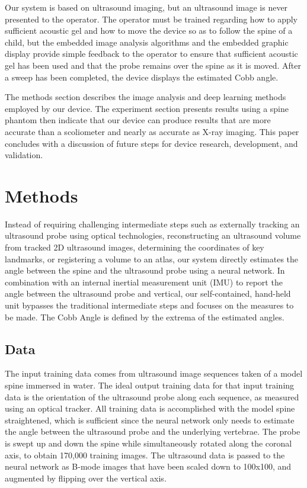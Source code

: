 \documentclass{article}
\begin{document}
Our system is based on ultrasound imaging, but an ultrasound image is never presented to the operator.  The operator must be trained regarding how to apply sufficient acoustic gel and how to move the device so as to follow the spine of a child, but the embedded image analysis algorithms and the embedded graphic display provide simple feedback to the operator to ensure that sufficient acoustic gel has been used and that the probe remains over the spine as it is moved.  After a sweep has been completed, the device displays the estimated Cobb angle.

The methods section describes the image analysis and deep learning methods employed by our device.  The experiment section presents results using a spine phantom then indicate that our device can produce results that are more accurate than a scoliometer and nearly as accurate as X-ray imaging.  This paper concludes with a discussion of future steps for device research, development, and validation.

\section{Methods}
\label{sec:methods}

Instead of requiring challenging intermediate steps such as externally tracking an ultrasound probe using optical technologies, reconstructing an ultrasound volume from tracked 2D ultrasound images, determining the coordinates of key landmarks, or registering a volume to an atlas, our system directly estimates the angle between the spine and the ultrasound probe using a neural network. In combination with an internal inertial measurement unit (IMU) to report the angle between the ultrasound probe and vertical, our self-contained, hand-held unit bypasses the traditional intermediate steps and focuses on the measures to be made. The Cobb Angle is defined by the extrema of the estimated angles.

\subsection{Data}
\label{ssec:Data}
The input training data comes from ultrasound image sequences taken of a model spine immersed in water. The ideal output training data for that input training data is the orientation of the ultrasound probe along each sequence, as measured using an optical tracker.  All training data is accomplished with the model spine straightened, which is sufficient since the neural network only needs to estimate the angle between the ultrasound probe and the underlying vertebrae. The probe is swept up and down the spine while simultaneously rotated along the coronal axis, to obtain 170,000 training images. The ultrasound data is passed to the neural network as B-mode images that have been scaled down to 100x100, and augmented by flipping over the vertical axis. 
\end{document}
